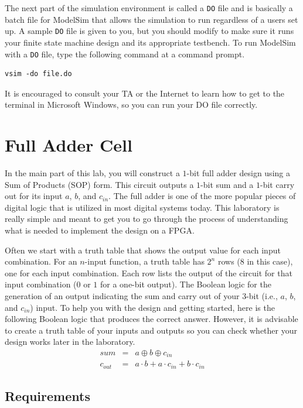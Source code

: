 \documentclass{article}
\begin{document}
The next part of the simulation environment is called a \verb+DO+ file
and is basically a batch file for ModelSim that allows the simulation
to run regardless of a users set up.  A sample \verb+DO+ file is given
to you, but you should modify to make sure it runs your finite state
machine design and its appropriate testbench.  To run ModelSim with a
\verb+DO+ file, type the following command at a command prompt.
\begin{verbatim}
vsim -do file.do
\end{verbatim}
It is encouraged to consult your TA or the Internet to learn how to get to
the terminal in Microsoft Windows, so you can run your DO file
correctly. 

\section{Full Adder Cell}

In the main part of this lab, you will construct a $1$-bit
full adder design using a Sum of Products (SOP) form.  This
circuit outputs a $1$-bit sum and a $1$-bit carry out for its input
$a$, $b$, and $c_{in}$.  The full adder is one of the more popular
pieces of digital logic that is utilized in most digital systems
today.  
This laboratory is really simple and meant to get you to go through
the process of understanding what is needed to implement the design on
a FPGA.

Often we start with a truth table that shows the output value for each
input combination. For an $n$-input function, a truth table has $2^n$
rows ($8$ in this case), one for each input combination. Each row lists
the output of the circuit for that input combination ($0$ or $1$ for a
one-bit output).  
The Boolean logic for the generation of an output indicating the sum
and carry out
of your $3$-bit (i.e., $a$, $b$, and $c_{in}$) input.  
To help you with the design and getting started, here is the following
Boolean logic that produces the correct answer.  However, it is
advisable to create a truth table of your inputs and outputs so you
can check whether your design works later in the laboratory.  
\begin{eqnarray*}
  sum & = & a \oplus b \oplus c_{in} \\
  c_{out} & = & a \cdot b + a \cdot c_{in} + b \cdot c_{in}
\end{eqnarray*}

\subsection{Requirements}
\end{document}
